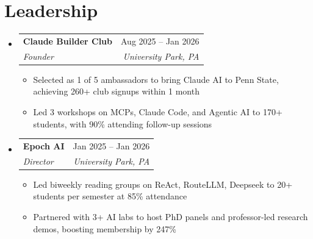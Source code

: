 \documentclass[letterpaper,11pt]{article}
\makeatletter
\newcommand{\resumeItem}[1]{
  \item\small{
    {#1 \vspace{-4pt}}
  }
}
\newcommand{\resumeSubheading}[4]{
  \vspace{-2pt}\item
    \begin{tabular*}{0.97\textwidth}[t]{l@{\extracolsep{\fill}}r}
      \textbf{#1} & #2 \\
      \textit{\small#3} & \textit{\small #4} \\
    \end{tabular*}\vspace{-7pt}
}
\newcommand{\resumeSubHeadingListStart}{\begin{itemize}[leftmargin=0.15in, label={}]}
\newcommand{\resumeSubHeadingListEnd}{\end{itemize}}
\newcommand{\resumeItemListStart}{\begin{itemize}}
\newcommand{\resumeItemListEnd}{\end{itemize}\vspace{-8pt}}
\makeatother
\begin{document}
\section{\textbf{Leadership}}
  \resumeSubHeadingListStart
    \resumeSubheading
      {Claude Builder Club}{Aug 2025 -- Jan 2026}
      {Founder}{University Park, PA}
      \resumeItemListStart
              \resumeItem{Selected as 1 of 5 ambassadors to bring Claude AI to Penn State, achieving 260+ club signups within 1 month}
              \resumeItem{Led 3 workshops on MCPs, Claude Code, and Agentic AI to 170+ students, with 90\% attending follow-up sessions}
        \resumeItemListEnd
    \resumeSubheading
      {Epoch AI}{Jan 2025 -- Jan 2026}
      {Director}{University Park, PA}
      \resumeItemListStart
              \resumeItem{Led biweekly reading groups on ReAct, RouteLLM, Deepseek to 20+ students per semester at 85\% attendance}
              \resumeItem{Partnered with 3+ AI labs to host PhD panels and professor-led research demos, boosting membership by 247\%}
      \resumeItemListEnd
    \resumeSubHeadingListEnd

\end{document}
